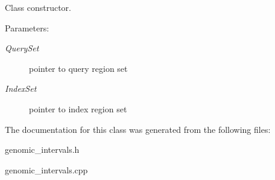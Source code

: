 Class constructor. 

\begin{Desc}
\item[Parameters:]
\begin{description}
\item[{\em QuerySet}]pointer to query region set \item[{\em IndexSet}]pointer to index region set \end{description}
\end{Desc}


The documentation for this class was generated from the following files:\begin{CompactItemize}
\item 
genomic\_\-intervals.h\item 
genomic\_\-intervals.cpp\end{CompactItemize}
